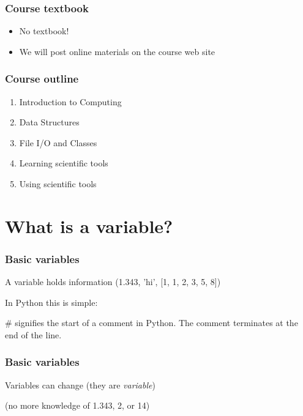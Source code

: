\documentclass{beamer}
\begin{document}
\begin{frame}
\frametitle{Course textbook}

\begin{itemize}
\setlength{\itemsep}{0.2in}
\item{No textbook!}
\item{We will post online materials on the course web site}
\end{itemize}

\end{frame}



\begin{frame}
\frametitle{Course outline}

\begin{enumerate}
\setlength{\itemsep}{0.2in}

\item{Introduction to Computing}
\item{Data Structures}
\item{File I/O and Classes}
\item{Learning scientific tools}
\item{Using scientific tools}

\end{enumerate}

\end{frame}



\section{What is a variable?}
\begin{frame}
\frametitle{Basic variables}

A variable holds information (1.343, 'hi', [1, 1, 2, 3, 5, 8])

\vspace{0.2in}

In Python this is simple:


\textcolor{comment-color}{\#} signifies the start of a comment in Python.  The comment terminates at the end of the line.

\end{frame}


\begin{frame}
\frametitle{Basic variables}

Variables can change (they are \emph{variable})



(no more knowledge of 1.343, 2, or 14)

\end{frame}
\end{document}
